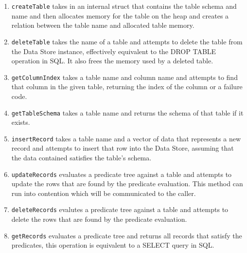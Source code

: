 \documentclass[letterpaper, 11pt]{article}
\newcommand{\inlinecode}[1]{\colorbox{codegrey}{\lstinline[language=C++]{#1}}}
\begin{document}
\begin{enumerate}
  \item \inlinecode{createTable} takes in an internal struct that contains the table schema and name and then
  allocates memory for the table on the heap and creates a relation between the table name and allocated table
  memory.
  \item \inlinecode{deleteTable} takes the name of a table and attempts to delete the table from the Data Store
  instance, effectively equivalent to the DROP TABLE operation in SQL. It also frees the memory used by a deleted
  table.
  \item \inlinecode{getColumnIndex} takes a table name and column name and attempts to find that column in the given
  table, returning the index of the column or a failure code.
  \item \inlinecode{getTableSchema} takes a table name and returns the schema of that table if it exists.
  \item \inlinecode{insertRecord} takes a table name and a vector of data that represents a new record and attempts
  to insert that row into the Data Store, assuming that the data contained satisfies the table's schema.
  \item \inlinecode{updateRecords} evaluates a predicate tree against a table and attempts to update the rows that
  are found by the predicate evaluation. This method can run into contention which will be communicated to the caller.
  \item \inlinecode{deleteRecords} evalutes a predicate tree against a table and attempts to delete the rows that
  are found by the predicate evaluation.
  \item \inlinecode{getRecords} evaluates a predicate tree and returns all records that satisfy the predicates, this 
  operation is equivalent to a SELECT query in SQL.
\end{enumerate}

\end{document}
